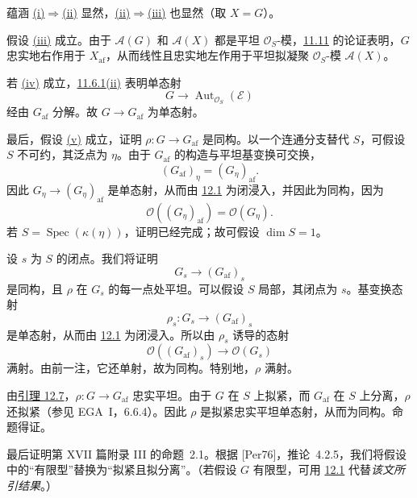 蕴涵 \hyperref[prop:sga3-VIB-12.9-i]{\textup{(i)}}\(\Rightarrow\)\hyperref[prop:sga3-VIB-12.9-ii]{\textup{(ii)}} 显然，\hyperref[prop:sga3-VIB-12.9-ii]{\textup{(ii)}}\(\Rightarrow\)\hyperref[prop:sga3-VIB-12.9-iii]{\textup{(iii)}} 也显然\textup{（取 \(X=G\)）}。

假设 \hyperref[prop:sga3-VIB-12.9-iii]{\textup{(iii)}} 成立。由于 \(\mathcal A(G)\) 和 \(\mathcal A(X)\) 都是平坦 \(\mathcal O_S\)-模，\hyperref[prop:sga3-VIB-11.11]{11.11} 的论证表明，\(G\) 忠实地右作用于 \(X_{\mathrm{af}}\)，从而线性且忠实地左作用于平坦拟凝聚 \(\mathcal O_S\)-模 \(\mathcal A(X)\)。

若 \hyperref[prop:sga3-VIB-12.9-iv]{\textup{(iv)}} 成立，\hyperref[prop:sga3-VIB-11.6.1]{11.6.1\textup{(ii)}} 表明单态射
\[
  G\longrightarrow\operatorname{Aut}_{\mathcal O_S}(\mathcal E)
\]
经由 \(G_{\mathrm{af}}\) 分解。故 \(G\to G_{\mathrm{af}}\) 为单态射。

最后，假设 \hyperref[prop:sga3-VIB-12.9-v]{\textup{(v)}} 成立，证明 \(\rho:G\to G_{\mathrm{af}}\) 是同构。以一个连通分支替代 \(S\)，可假设 \(S\) 不可约，其泛点为 \(\eta\)。由于 \(G_{\mathrm{af}}\) 的构造与平坦基变换可交换，
\[
  (G_{\mathrm{af}})_\eta=(G_\eta)_{\mathrm{af}}.
\]
因此 \(G_\eta\to(G_\eta)_{\mathrm{af}}\) 是单态射，从而由 \hyperref[lem:sga3-VIB-12.1]{12.1} 为闭浸入，并因此为同构，因为
\[
  \mathcal O((G_\eta)_{\mathrm{af}})=\mathcal O(G_\eta).
\]
若 \(S=\operatorname{Spec}(\kappa(\eta))\)，证明已经完成；故可假设 \(\dim S=1\)。

设 \(s\) 为 \(S\) 的闭点。我们将证明
\[
  G_s\longrightarrow(G_{\mathrm{af}})_s
\]
是同构，且 \(\rho\) 在 \(G_s\) 的每一点处平坦。可以假设 \(S\) 局部，其闭点为 \(s\)。基变换态射
\[
  \rho_s:G_s\longrightarrow(G_{\mathrm{af}})_s
\]
是单态射，从而由 \hyperref[lem:sga3-VIB-12.1]{12.1} 为闭浸入。所以由 \(\rho_s\) 诱导的态射
\[
  \mathcal O((G_{\mathrm{af}})_s)
    \longrightarrow\mathcal O(G_s)
\]
满射。由前一注，它还单射，故为同构。特别地，\(\rho\) 满射。

由\hyperref[lem:sga3-VIB-12.7]{引理 12.7}，\(\rho:G\to G_{\mathrm{af}}\) 忠实平坦。由于 \(G\) 在 \(S\) 上拟紧，而 \(G_{\mathrm{af}}\) 在 \(S\) 上分离，\(\rho\) 还拟紧\textup{（参见 EGA~I，6.6.4）}。因此 \(\rho\) 是拟紧忠实平坦单态射，从而为同构。命题得证。

最后证明第 XVII 篇附录 III 的命题~2.1。根据 \textup{[Per76]}，推论~4.2.5，我们将假设中的“有限型”替换为“拟紧且拟分离”。\textup{（若假设 \(G\) 有限型，可用 \hyperref[lem:sga3-VIB-12.1]{12.1} 代替\emph{该文所引结果}。）}

